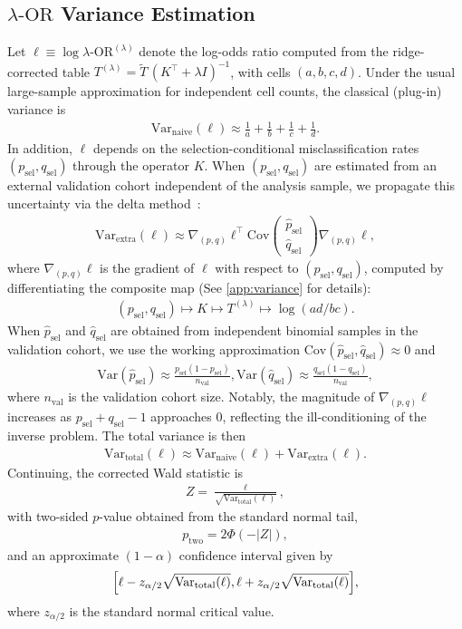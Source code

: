 \documentclass[pdflatex,sn-mathphys-num]{sn-jnl}%
\def\EQSP{3pt}
\newcommand{\mltlne}[2][\EQSP]{\begingroup\setlength\abovedisplayskip{#1}\setlength\belowdisplayskip{#1}\begin{equation}\begin{multlined} #2 \end{multlined}\end{equation}\endgroup\noindent}
\newcommand{\cgather}[2][\EQSP]{\begingroup\setlength\abovedisplayskip{#1}\setlength\belowdisplayskip{#1}\begin{gather} #2 \end{gather}\endgroup\noindent}
\newcommand{\cgathers}[2][\EQSP]{\begingroup\setlength\abovedisplayskip{#1}\setlength\belowdisplayskip{#1}\begin{gather*} #2 \end{gather*}\endgroup\noindent}
\newcommand{\SPOR}{\textrm{$\lambda$-OR}}
\newcommand{\logor}{\log\SPOR}
\theoremstyle{thmstyleone}%
\theoremstyle{thmstyletwo}%
\theoremstyle{thmstylethree}%
\begin{document}
\subsection{$\SPOR$ Variance Estimation}
Let $\ell \equiv \logor^{(\lambda)}$ denote the log-odds ratio computed from the
ridge-corrected table $T^{(\lambda)}=\tilde T\,(K^\top+\lambda I)^{-1}$, with cells $(a,b,c,d)$.
Under the usual large-sample approximation for independent cell counts, the classical (plug-in) variance is
\cgather{
\mathrm{Var}_{\text{naive}}(\ell) \approx \frac{1}{a} + \frac{1}{b} + \frac{1}{c} + \frac{1}{d}.
}%
In addition, $\ell$ depends on the selection-conditional misclassification rates
$(p_{\text{sel}},q_{\text{sel}})$ through the operator $K$. When $(p_{\text{sel}},q_{\text{sel}})$ are estimated
from an external validation cohort independent of the analysis sample, we propagate this uncertainty via the delta method~\cite{vanderVaart1998Asymptotic,oehlert1992delta}:
\mltlne{
\mathrm{Var}_{\text{extra}}(\ell)
\approx
\nabla_{(p,q)} \ell^\top
\mathrm{Cov}\begin{pmatrix}\hat p_{\text{sel}} \\ \hat q_{\text{sel}}\end{pmatrix}
\nabla_{(p,q)} \ell,
}
where $\nabla_{(p,q)}\ell$ is the gradient of $\ell$ with respect to $(p_{\text{sel}},q_{\text{sel}})$,
computed by differentiating the composite map (See \ref{app:variance} for details):
\cgather{
(p_{\text{sel}},q_{\text{sel}})\mapsto K \mapsto T^{(\lambda)} \mapsto \log(ad/bc).
}
When $\hat p_{\text{sel}}$ and $\hat q_{\text{sel}}$ are obtained from independent binomial samples in the validation cohort,
we use the working approximation $\mathrm{Cov}(\hat p_{\text{sel}},\hat q_{\text{sel}})\approx 0$ and
\cgather{
\mathrm{Var}(\hat p_{\text{sel}})\approx \frac{p_{\text{sel}}(1-p_{\text{sel}})}{n_{\text{val}}},
\mathrm{Var}(\hat q_{\text{sel}})\approx \frac{q_{\text{sel}}(1-q_{\text{sel}})}{n_{\text{val}}},
}
where $n_{\text{val}}$ is the validation cohort size.
Notably, the magnitude of $\nabla_{(p,q)}\ell$ increases as $p_{\text{sel}}+q_{\text{sel}}-1$ approaches $0$,
reflecting the ill-conditioning of the inverse problem. The total variance is then
\cgather{
\mathrm{Var}_{\text{total}}(\ell) \approx \mathrm{Var}_{\text{naive}}(\ell) + \mathrm{Var}_{\text{extra}}(\ell).
}%
Continuing, the corrected Wald statistic is
\cgather{
Z = \frac{\ell}{\sqrt{\mathrm{Var}_{\text{total}}(\ell)}},
}
with two-sided $p$-value obtained from the standard normal tail,
\cgather{
p_{\text{two}} = 2 \Phi(-|Z|),
}
and an approximate $(1-\alpha)$ confidence interval given by
\cgathers{
\Bigl[ \ell - z_{\alpha/2} \sqrt{\mathrm{Var}_{\text{total}}(\ell)},
        \ell + z_{\alpha/2} \sqrt{\mathrm{Var}_{\text{total}}(\ell)} \Bigr],
}
where $z_{\alpha/2}$ is the standard normal critical value.
\end{document}
